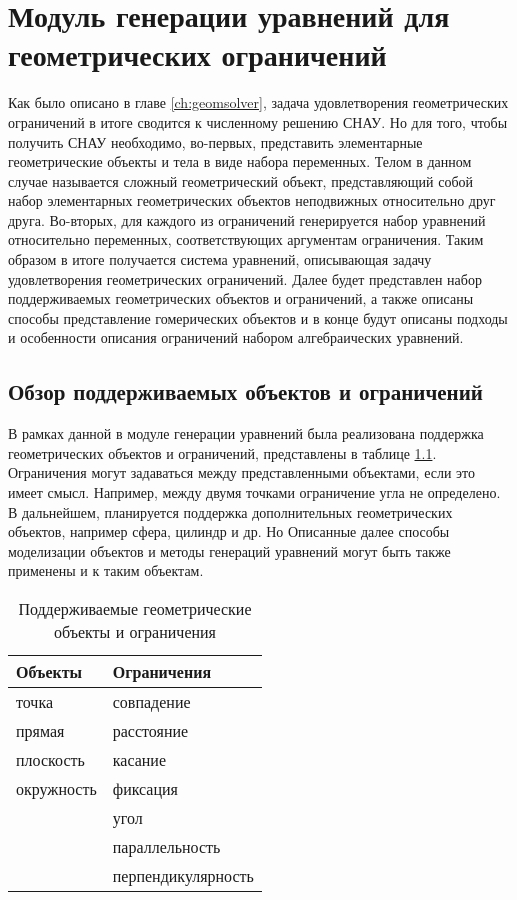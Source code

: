 \chapter{Модуль генерации уравнений для геометрических ограничений}\label{ch:modeler}

Как было описано в главе \ref{ch:geomsolver}, задача удовлетворения геометрических ограничений в итоге сводится к численному решению СНАУ. Но для того, чтобы получить СНАУ необходимо, во-первых, представить элементарные геометрические объекты и тела в виде набора переменных. Телом в данном случае называется сложный геометрический объект, представляющий собой набор элементарных геометрических объектов неподвижных относительно друг друга. Во-вторых, для каждого из ограничений генерируется набор уравнений относительно переменных, соответствующих аргументам ограничения. Таким образом в итоге получается система уравнений, описывающая задачу удовлетворения геометрических ограничений. Далее будет представлен набор поддерживаемых геометрических объектов и ограничений, а также описаны способы представление гомерических объектов и в конце будут описаны подходы и особенности описания ограничений набором алгебраических уравнений.

\section{Обзор поддерживаемых объектов и ограничений}

В рамках данной в модуле генерации уравнений была реализована поддержка геометрических объектов и ограничений, представлены в таблице \ref{tab:supp_obj_and_constr}. Ограничения могут задаваться между представленными объектами, если это имеет смысл. Например, между двумя точками ограничение угла не определено. В дальнейшем, планируется поддержка дополнительных геометрических объектов, например сфера, цилиндр и др. Но Описанные далее способы моделизации объектов и методы генераций уравнений могут быть также применены и к таким объектам.

\begin{table}[htbp]
	\caption{Поддерживаемые геометрические объекты и ограничения}
	\label{tab:supp_obj_and_constr}
	\begin{tabularx}{\textwidth}{XX}
		\toprule
		\textbf{Объекты} & \textbf{Ограничения}\\
		\hline
		точка       & совпадение\\
		прямая      & расстояние\\
		плоскость   & касание   \\
		окружность  & фиксация  \\
		            & угол      \\
		            & параллельность\\
		            & перпендикулярность\\
		\bottomrule
	\end{tabularx}
\end{table}

